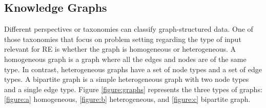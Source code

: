 \subsection{Knowledge Graphs}

Different perspectives or taxonomies \citep{lee2019attention} can classify graph-structured data. One of those taxonomies that focus on problem setting regarding the type of input relevant for RE is whether the graph is homogeneous or heterogeneous. A homogeneous graph is a graph where all the edges and nodes are of the same type. In contrast, heterogeneous graphs have a set of node types and a set of edge types. A bipartite graph is a simple heterogeneous graph with two node types and a single edge type. Figure \ref{figure:graphs} represents the three types of graphs: \ref{figure:a} homogeneous, \ref{figure:b} heterogeneous, and \ref{figure:c} bipartite graph. 

